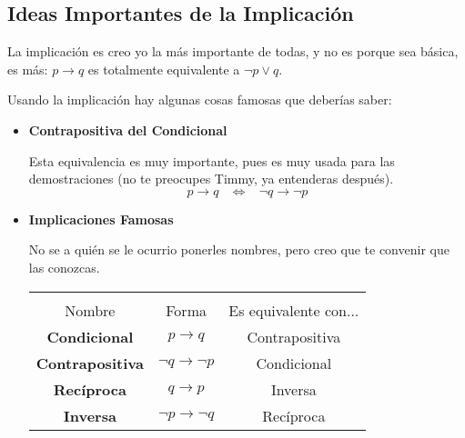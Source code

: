 \documentclass[12pt, fleqn]{report}                             %
\DeclareMathOperator \Space {\quad}                             %
\DeclareMathOperator \MiniSpace {\;}                            %
\newcommand \lequal {\MiniSpace \Leftrightarrow \MiniSpace}     %
\begin{document}
                \subsection{Ideas Importantes de la Implicación}

                    La implicación es creo yo la más importante de todas, y no es porque sea básica, 
                    es más: $p \to q$ es totalmente equivalente a $\lnot p \lor q$.

                    Usando la implicación hay algunas cosas famosas que deberías saber:

                    \begin{itemize}
                        \item \textbf{Contrapositiva del Condicional}
                                
                            Esta equivalencia es muy importante, pues es muy usada para las demostraciones
                            (no te preocupes Timmy, ya entenderas después).
                            \begin{equation*}
                                p \to q \lequal \lnot q \to \lnot p
                            \end{equation*}

                        \item \textbf{Implicaciones Famosas}

                            No se a quién se le ocurrio ponerles nombres, pero creo que te convenir
                            que las conozcas.

                            \begin{tabular}{ |c|c|c| } 
                                \hline &&\\
                                \large{Nombre} & \large{Forma} & \large{Es equivalente con...}      \\[0.5em]
                                \hline \hline
                                
                                \textbf{Condicional}    & $p \to q$             & Contrapositiva    \\ \hline
                                \textbf{Contrapositiva} & $\lnot q \to \lnot p$ & Condicional       \\ \hline\hline 

                                \textbf{Recíproca}      & $q \to p$             & Inversa           \\ \hline
                                \textbf{Inversa}        & $\lnot p \to \lnot q$ & Recíproca         \\ \hline
                            \end{tabular}

                    \end{itemize}
\end{document}
